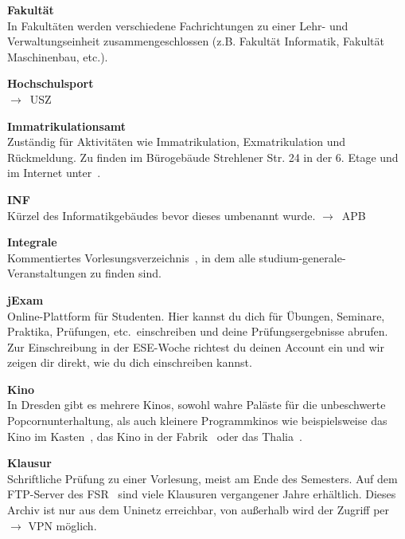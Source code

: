 \begin{multicols}{2}
\textbf{Fakultät} \\
In Fakultäten werden verschiedene Fachrichtungen zu einer Lehr- und Verwaltungseinheit zusammengeschlossen (z.B. Fakultät Informatik, Fakultät Maschinenbau, etc.).


\textbf{Hochschulsport} \\
$\rightarrow$~USZ

\textbf{Immatrikulationsamt} \\
Zuständig für Aktivitäten wie Immatrikulation, Exmatrikulation und Rückmeldung.
Zu finden im Bürogebäude Strehlener Str. 24 in der 6. Etage und im Internet unter~.

\textbf{INF} \\
Kürzel des Informatikgebäudes bevor dieses umbenannt wurde.
$\rightarrow$~APB

\textbf{Integrale} \\
Kommentiertes Vorlesungsverzeichnis~, in dem alle studium-generale-Veranstaltungen zu finden sind.

\textbf{jExam} \\
Online-Plattform für Studenten.
Hier kannst du dich für Übungen, Seminare, Praktika, Prüfungen, etc.\ einschreiben und deine Prüfungsergebnisse abrufen.
Zur Einschreibung in der ESE-Woche richtest du deinen Account ein und wir zeigen dir direkt, wie du dich einschreiben kannst.~

\textbf{Kino} \\
In Dresden gibt es mehrere Kinos, sowohl wahre Paläste für die unbeschwerte Popcornunterhaltung, als auch kleinere Programmkinos wie beispielsweise das Kino im Kasten~, das Kino in der Fabrik~ oder das Thalia~.

\textbf{Klausur} \\
Schriftliche Prüfung zu einer Vorlesung, meist am Ende des Semesters.
Auf dem FTP-Server des FSR~ sind viele Klausuren vergangener Jahre erhältlich. Dieses Archiv ist nur aus dem Uninetz erreichbar, von außerhalb wird der Zugriff per $\rightarrow$ VPN möglich.


\end{multicols}
